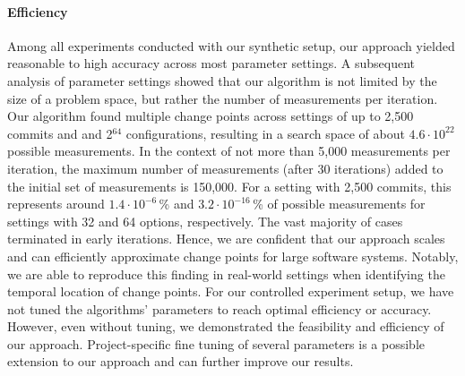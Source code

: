 \documentclass[sigconf]{acmart}
\begin{document}
	\paragraph{Efficiency} Among all experiments conducted with our synthetic setup, our approach yielded reasonable to high accuracy across most parameter settings. A subsequent analysis of parameter settings showed that our algorithm is not limited by the size of a problem space, but rather the number of measurements per iteration. 
	Our algorithm found multiple change points across settings of up to 2,500 commits and and 2$^{64}$ configurations, resulting in a search space of about $4.6 \cdot 10^{22}$ possible measurements.
	In the context of not more than 5,000 measurements per iteration, the maximum number of measurements (after 30 iterations) added to the initial set of measurements is 150,000. For a setting with 2,500 commits, this represents around $1.4 \cdot 10^{-6}$\,\% and $3.2\cdot 10^{-16}$\,\% of possible measurements for settings with 32 and 64 options, respectively. The vast majority of cases terminated in early iterations. Hence, we are confident that our approach scales and can efficiently approximate change points for large software systems. Notably, we are able to reproduce this finding in real-world settings when identifying the temporal location of change points. For our controlled experiment setup, we have not tuned the algorithms’ parameters to reach optimal efficiency or accuracy. However, even without tuning, we demonstrated the feasibility and efficiency of our approach. Project-specific fine tuning of several parameters is a possible extension to our approach and can further improve our results.
	
\end{document}
